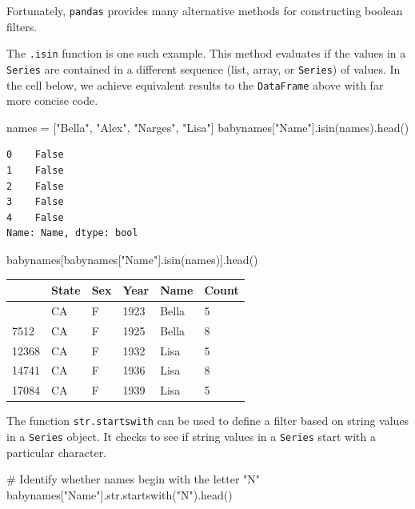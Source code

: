 \documentclass[
  letterpaper,
  DIV=11,
  numbers=noendperiod]{scrreprt}
\newenvironment{Shaded}{\begin{snugshade}}{\end{snugshade}}
\newcommand{\BuiltInTok}[1]{\textcolor[rgb]{0.00,0.23,0.31}{#1}}
\newcommand{\CommentTok}[1]{\textcolor[rgb]{0.37,0.37,0.37}{#1}}
\newcommand{\NormalTok}[1]{\textcolor[rgb]{0.00,0.23,0.31}{#1}}
\newcommand{\OperatorTok}[1]{\textcolor[rgb]{0.37,0.37,0.37}{#1}}
\newcommand{\StringTok}[1]{\textcolor[rgb]{0.13,0.47,0.30}{#1}}
\begin{document}
Fortunately, \texttt{pandas} provides many alternative methods for
constructing boolean filters.

The \texttt{.isin} function is one such example. This method evaluates
if the values in a \texttt{Series} are contained in a different sequence
(list, array, or \texttt{Series}) of values. In the cell below, we
achieve equivalent results to the \texttt{DataFrame} above with far more
concise code.

\begin{Shaded}
\begin{Highlighting}[]
\NormalTok{names }\OperatorTok{=}\NormalTok{ [}\StringTok{"Bella"}\NormalTok{, }\StringTok{"Alex"}\NormalTok{, }\StringTok{"Narges"}\NormalTok{, }\StringTok{"Lisa"}\NormalTok{]}
\NormalTok{babynames[}\StringTok{"Name"}\NormalTok{].isin(names).head()}
\end{Highlighting}
\end{Shaded}

\begin{verbatim}
0    False
1    False
2    False
3    False
4    False
Name: Name, dtype: bool
\end{verbatim}

\begin{Shaded}
\begin{Highlighting}[]
\NormalTok{babynames[babynames[}\StringTok{"Name"}\NormalTok{].isin(names)].head()}
\end{Highlighting}
\end{Shaded}

\begin{longtable}[]{@{}llllll@{}}
\toprule\noalign{}
& State & Sex & Year & Name & Count \\
\midrule\noalign{}
\endhead
\bottomrule\noalign{}
\endlastfoot
6289 & CA & F & 1923 & Bella & 5 \\
7512 & CA & F & 1925 & Bella & 8 \\
12368 & CA & F & 1932 & Lisa & 5 \\
14741 & CA & F & 1936 & Lisa & 8 \\
17084 & CA & F & 1939 & Lisa & 5 \\
\end{longtable}

The function \texttt{str.startswith} can be used to define a filter
based on string values in a \texttt{Series} object. It checks to see if
string values in a \texttt{Series} start with a particular character.

\begin{Shaded}
\begin{Highlighting}[]
\CommentTok{\# Identify whether names begin with the letter "N"}
\NormalTok{babynames[}\StringTok{"Name"}\NormalTok{].}\BuiltInTok{str}\NormalTok{.startswith(}\StringTok{"N"}\NormalTok{).head()}
\end{Highlighting}
\end{Shaded}
\end{document}
